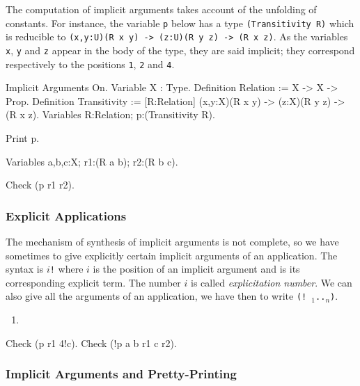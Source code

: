 \begin{coq_example}
The computation of implicit arguments takes account of the
unfolding of constants.  For instance, the variable {\tt p} below has
a type {\tt (Transitivity R)} which is reducible to {\tt (x,y:U)(R x
y) -> (z:U)(R y z) -> (R x z)}. As the variables {\tt x}, {\tt y} and
{\tt z} appear in the body of the type, they are said implicit; they
correspond respectively to the positions {\tt 1}, {\tt 2} and {\tt 4}.

\begin{coq_example*}
Implicit Arguments On.
Variable X : Type.
Definition Relation := X -> X -> Prop.
Definition Transitivity := [R:Relation]
           (x,y:X)(R x y) -> (z:X)(R y z) -> (R x z).
Variables R:Relation; p:(Transitivity R).
\end{coq_example*}
\begin{coq_example}
Print p.
\end{coq_example}
\begin{coq_example*}
Variables a,b,c:X;  r1:(R a b); r2:(R b c).
\end{coq_example*}
\begin{coq_example}
Check (p r1 r2).
\end{coq_example}

\subsubsection{Explicit Applications}

The mechanism of synthesis of implicit arguments is not complete, so
we have sometimes to give explicitly certain implicit arguments of an
application. The syntax is {\tt $i$!}{\term} where $i$ is the position
of an implicit argument and {\term} is its corresponding explicit
term. The number $i$ is called {\em explicitation number}.  We can
also give all the arguments of an application, we have then to write
{\tt (!{\ident}~{\term}$_1$..{\term}$_n$)}.

\ErrMsg
\begin{enumerate}
\item {}
\end{enumerate}

\Example

\begin{coq_example}
Check (p r1 4!c).
Check (!p a b r1 c r2).
\end{coq_example}

\subsubsection{Implicit Arguments and Pretty-Printing}


\end{coq_example}
